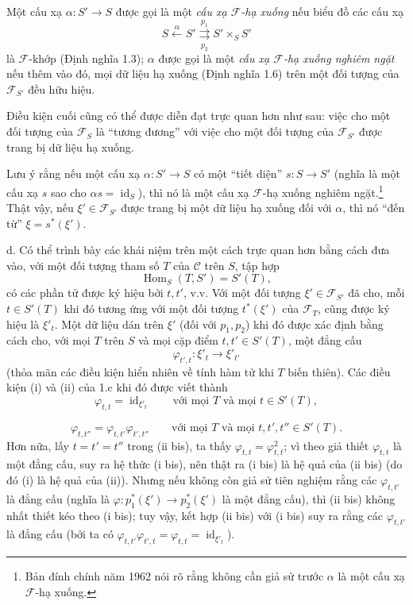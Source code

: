  Một cấu xạ $\alpha:S'\longrightarrow S$ được gọi là
một \emph{cấu xạ $\mathcal F$-hạ xuống} nếu biểu đồ các cấu xạ
\[
  S\xleftarrow{\alpha}S'
  \overset{p_1}{\underset{p_2}{\rightrightarrows}}S'\times_S S'
\]
là $\mathcal F$-khớp (Định nghĩa 1.3); $\alpha$ được gọi là một
\emph{cấu xạ $\mathcal F$-hạ xuống nghiêm ngặt} nếu thêm vào đó, mọi dữ liệu hạ
xuống (Định nghĩa 1.6) trên một đối tượng của $\mathcal F_{S'}$ đều hữu hiệu.

Điều kiện cuối cũng có thể được diễn đạt trực quan hơn như sau: việc cho một
đối tượng của $\mathcal F_S$ là ``tương đương'' với việc cho một đối tượng của
$\mathcal F_{S'}$ được trang bị dữ liệu hạ xuống.

Lưu ý rằng nếu một cấu xạ $\alpha:S'\longrightarrow S$ có một ``tiết diện''
$s:S\longrightarrow S'$ (nghĩa là một cấu xạ $s$ sao cho
$\alpha s=\operatorname{id}_S$), thì nó là một cấu xạ
$\mathcal F$-hạ xuống nghiêm ngặt.\footnote{Bản đính chính năm 1962 nói rõ rằng
không cần giả sử trước $\alpha$ là một cấu xạ $\mathcal F$-hạ xuống.} Thật vậy,
nếu $\xi'\in\mathcal F_{S'}$ được trang bị một dữ liệu hạ xuống đối với
$\alpha$, thì nó ``đến từ'' $\xi=s^*(\xi')$.

\medskip\noindent
d. Có thể trình bày các khái niệm trên một cách trực quan hơn bằng cách đưa vào,
với một đối tượng tham số $T$ của $\mathcal C$ trên $S$, tập hợp
\[
  \operatorname{Hom}_S(T,S')=S'(T),
\]
có các phần tử được ký hiệu bởi $t,t'$, v.v. Với một đối tượng
$\xi'\in\mathcal F_{S'}$ đã cho, mỗi $t\in S'(T)$ khi đó tương ứng với một đối
tượng $t^*(\xi')$ của $\mathcal F_T$, cũng được ký hiệu là $\xi'_t$. Một dữ
liệu dán trên $\xi'$ (đối với $p_1,p_2$) khi đó được xác định bằng cách cho,
với mọi $T$ trên $S$ và mọi cặp điểm $t,t'\in S'(T)$, một đẳng cấu
\[
  \varphi_{t',t}:\xi'_t\longrightarrow\xi'_{t'}
\]
(thỏa mãn các điều kiện hiển nhiên về tính hàm tử khi $T$ biến thiên). Các điều
kiện (i) và (ii) của 1.c khi đó được viết thành
\[
  \tag{i bis}
  \varphi_{t,t}=\operatorname{id}_{\xi'_t}
  \qquad\text{với mọi $T$ và mọi $t\in S'(T)$},
\]

\[
  \tag{ii bis}
  \varphi_{t,t''}=\varphi_{t,t'}\varphi_{t',t''}
  \qquad\text{với mọi $T$ và mọi $t,t',t''\in S'(T)$}.
\]
Hơn nữa, lấy $t=t'=t''$ trong (ii bis), ta thấy
$\varphi_{t,t}=\varphi_{t,t}^2$; vì theo giả thiết $\varphi_{t,t}$ là một đẳng
cấu, suy ra hệ thức (i bis), nên thật ra (i bis) là hệ quả của (ii bis) (do đó
(i) là hệ quả của (ii)). Nhưng nếu không còn giả sử tiên nghiệm rằng các
$\varphi_{t,t'}$ là đẳng cấu (nghĩa là
$\varphi:p_1^*(\xi')\longrightarrow p_2^*(\xi')$ là một đẳng cấu), thì (ii bis)
không nhất thiết kéo theo (i bis); tuy vậy, kết hợp (ii bis) với (i bis) suy ra
rằng các $\varphi_{t,t'}$ là đẳng cấu (bởi ta có
$\varphi_{t,t'}\varphi_{t',t}=\varphi_{t,t}=\operatorname{id}_{\xi'_t}$).

